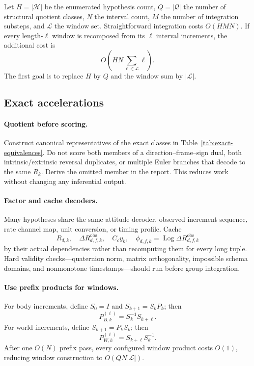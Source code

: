 \documentclass[11pt]{article}
\newcommand{\Log}{\operatorname{Log}}
\newcommand{\abs}[1]{\left\lvert #1 \right\rvert}
\begin{document}
    Let $H=\abs{\mathcal H}$ be the enumerated hypothesis count, $Q=\abs{\mathcal Q}$ the
    number of structural quotient classes, $N$ the interval count, $M$ the number of
    integration substeps, and $\mathcal L$ the window set. Straightforward integration costs
    $O(HMN)$. If every length-$\ell$ window is recomposed from its $\ell$ interval
    increments, the additional cost is
    \begin{equation}
        O\!\left(HN\sum_{\ell\in\mathcal L}\ell\right).
    \end{equation}
    The first goal is to replace $H$ by $Q$ and the window sum by $\abs{\mathcal L}$.

    \subsection{Exact accelerations}

    \paragraph{Quotient before scoring.}
    Construct canonical representatives of the exact classes in
    Table~\ref{tab:exact-equivalences}. Do not score both members of a
    direction--frame--sign dual, both intrinsic/extrinsic reversal duplicates, or multiple
    Euler branches that decode to the same $R_k$. Derive the omitted member in the report.
    This reduces work without changing any inferential output.

    \paragraph{Factor and cache decoders.}
    Many hypotheses share the same attitude decoder, observed increment sequence, rate
    channel map, unit conversion, or timing profile. Cache
    \begin{equation}
        R_{d,k},\quad
        \Delta R_{d,f,k}^{\mathrm{obs}},\quad
        C_c y_k,\quad
        \phi_{d,f,k}=\Log\Delta R_{d,f,k}^{\mathrm{obs}}
    \end{equation}
    by their actual dependencies rather than recomputing them for every long tuple. Hard
    validity checks---quaternion norm, matrix orthogonality, impossible schema domains, and
    nonmonotone timestamps---should run before group integration.

    \paragraph{Use prefix products for windows.}
    For body increments, define $S_0=I$ and $S_{k+1}=S_kP_k$; then
    \begin{equation}
        P_{B,k}^{(\ell)}=S_k^{-1}S_{k+\ell}.
    \end{equation}
    For world increments, define $S_{k+1}=P_kS_k$; then
    \begin{equation}
        P_{W,k}^{(\ell)}=S_{k+\ell}S_k^{-1}.
    \end{equation}
    After one $O(N)$ prefix pass, every configured window product costs $O(1)$, reducing
    window construction to $O(QN\abs{\mathcal L})$.
\end{document}
